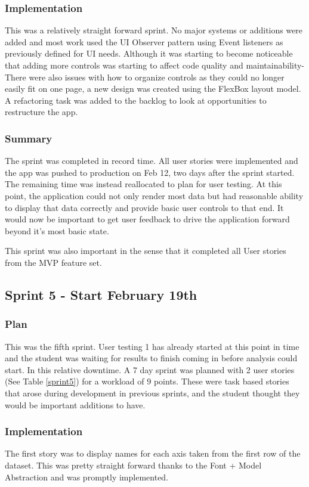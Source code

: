 \subsubsection{Implementation}
This was a relatively straight forward sprint. No major systems or additions were added and most work used the UI Observer pattern using Event listeners as previously defined for UI needs. Although it was starting to become noticeable that adding more controls was starting to affect code quality and maintainability- There were also issues with how to organize controls as they could no longer easily fit on one page, a new design was created using the FlexBox layout model. A refactoring task was added to the backlog to look at opportunities to restructure the app.

\subsubsection{Summary}
The sprint was completed in record time. All user stories were implemented and the app was pushed to production on Feb 12, two days after the sprint started. The remaining time was instead reallocated to plan for user testing. At this point, the application could not only render most data but had reasonable ability to display that data correctly and provide basic user controls to that end. It would now be important to get user feedback to drive the application forward beyond it's most basic state.

This sprint was also important in the sense that it completed all User stories from the MVP feature set.


\subsection{Sprint 5 - Start February 19th} \label{s5}
\subsubsection{Plan}
This was the fifth sprint. User testing 1 has already started at this point in time and the student was waiting for results to finish coming in before analysis could start.
In this relative downtime. A 7 day sprint was planned with 2 user stories (See Table \ref{sprint5}) for a workload of 9 points. These were task based stories that arose during development in previous sprints, and the student thought they would be important additions to have.

\subsubsection{Implementation}
The first story was to display names for each axis taken from the first row of the dataset. This was pretty straight forward thanks to the Font + Model Abstraction and was promptly implemented.

